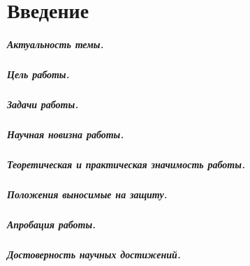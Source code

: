\renewcommand{\figurename}{Рисунок}
\renewcommand{\tablename}{Таблица}
\renewcommand\thesubfigure{\asbuk{subfigure}}
\chapter*{Введение}                         %

\paragraph*{Актуальность темы.}

\paragraph*{Цель работы.}

\paragraph*{Задачи работы.}

\paragraph*{Научная новизна работы.}

\paragraph*{Теоретическая и практическая значимость работы.}

\paragraph*{Положения выносимые на защиту.}

\paragraph*{Апробация работы.}

\paragraph*{Достоверность научных достижений.}

